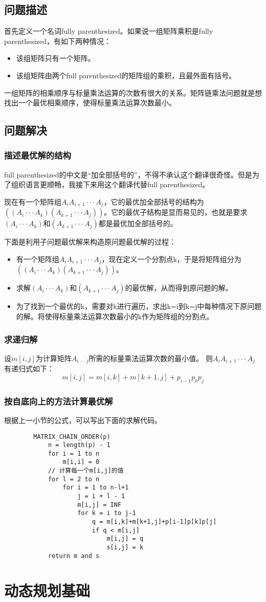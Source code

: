 \documentclass[a4paper,left=2.5cm,right=2.5cm,11pt]{article}
\begin{document}
\subsection{问题描述}
	首先定义一个名词fully parenthesized。如果说一组矩阵乘积是fully parenthesized，有如下两种情况：
	\begin{itemize}
		\item 该组矩阵只有一个矩阵。
		\item 该组矩阵由两个full parenthesized的矩阵组的乘积，且最外面有括号。
	\end{itemize}
	一组矩阵的相乘顺序与标量乘法运算的次数有很大的关系。矩阵链乘法问题就是想找出一个最优相乘顺序，使得标量乘法运算次数最小。

\subsection{问题解决}
\subsubsection{描述最优解的结构}
	full parenthesized的中文是“加全部括号的”，不得不承认这个翻译很奇怪。但是为了组织语言更顺畅，我接下来用这个翻译代替full parenthesized。\par
	现在有一个矩阵组$A_iA_{i+1}···A_j$，它的最优加全部括号的结构为$((A_i···A_k)(A_{k+1}···A_j))$。它的最优子结构是显而易见的，也就是要求$(A_i···A_k)$和$(A_{k+1}···A_j)$都是最优加全部括号的。\par
	下面是利用子问题最优解来构造原问题最优解的过程：
	\begin{itemize}
		\item 有一个矩阵组$A_iA_{i+1}···A_j$，现在定义一个分割点k，于是将矩阵组分为$((A_i···A_k)(A_{k+1}···A_j))$。
		\item 求解$(A_i···A_k)$和$(A_{k+1}···A_j)$的最优解，从而得到原问题的解。
		\item 为了找到一个最优的k，需要对k进行遍历，求出k=i到k=j中每种情况下原问题的解。将使得标量乘法运算次数最小的k作为矩阵组的分割点。 
	\end{itemize}
\subsubsection{求递归解}
	设$m[i,j]$为计算矩阵$A_{i···j}$所需的标量乘法运算次数的最小值。
	则$A_iA_{i+1}···A_j$有递归式如下：
	\begin{equation}
		m[i,j] = m[i,k] + m[k+1,j] + p_{i-1}p_kp_j
	\end{equation}
\subsubsection{按自底向上的方法计算最优解}
	根据上一小节的公式，可以写出下面的求解代码。
	\begin{lstlisting}
		MATRIX_CHAIN_ORDER(p)
			n = length(p) - 1
			for i = 1 to n
				m[i,i] = 0
			// 计算每一个m[i,j]的值
			for l = 2 to n
				for i = 1 to n-l+1
					j = i + l - 1
					m[i,j] = INF
					for k = i to j-1
						q = m[i,k]+m[k+1,j]+p[i-1]p[k]p[j]
						if q < m[i,j]
							m[i,j] = q
							s[i,j] = k
			return m and s
	\end{lstlisting}

\section{动态规划基础}
\end{document}
